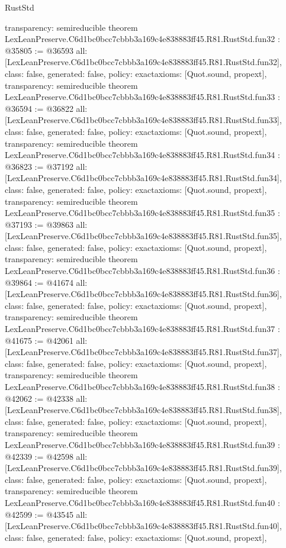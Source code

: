 \begin{lexlean}{RustStd}
\begin{coremodule}
{  transparency: semireducible
}
theorem LexLeanPreserve.C6d1bc0bcc7cbbb3a169c4e838883ff45.R81.RustStd.fun32 : @35805 := @36593 {
  all: [LexLeanPreserve.C6d1bc0bcc7cbbb3a169c4e838883ff45.R81.RustStd.fun32],
  class: false,
  generated: false,
  policy: exact{axioms: [Quot.sound, propext]},
  transparency: semireducible
}
theorem LexLeanPreserve.C6d1bc0bcc7cbbb3a169c4e838883ff45.R81.RustStd.fun33 : @36594 := @36822 {
  all: [LexLeanPreserve.C6d1bc0bcc7cbbb3a169c4e838883ff45.R81.RustStd.fun33],
  class: false,
  generated: false,
  policy: exact{axioms: [Quot.sound, propext]},
  transparency: semireducible
}
theorem LexLeanPreserve.C6d1bc0bcc7cbbb3a169c4e838883ff45.R81.RustStd.fun34 : @36823 := @37192 {
  all: [LexLeanPreserve.C6d1bc0bcc7cbbb3a169c4e838883ff45.R81.RustStd.fun34],
  class: false,
  generated: false,
  policy: exact{axioms: [Quot.sound, propext]},
  transparency: semireducible
}
theorem LexLeanPreserve.C6d1bc0bcc7cbbb3a169c4e838883ff45.R81.RustStd.fun35 : @37193 := @39863 {
  all: [LexLeanPreserve.C6d1bc0bcc7cbbb3a169c4e838883ff45.R81.RustStd.fun35],
  class: false,
  generated: false,
  policy: exact{axioms: [Quot.sound, propext]},
  transparency: semireducible
}
theorem LexLeanPreserve.C6d1bc0bcc7cbbb3a169c4e838883ff45.R81.RustStd.fun36 : @39864 := @41674 {
  all: [LexLeanPreserve.C6d1bc0bcc7cbbb3a169c4e838883ff45.R81.RustStd.fun36],
  class: false,
  generated: false,
  policy: exact{axioms: [Quot.sound, propext]},
  transparency: semireducible
}
theorem LexLeanPreserve.C6d1bc0bcc7cbbb3a169c4e838883ff45.R81.RustStd.fun37 : @41675 := @42061 {
  all: [LexLeanPreserve.C6d1bc0bcc7cbbb3a169c4e838883ff45.R81.RustStd.fun37],
  class: false,
  generated: false,
  policy: exact{axioms: [Quot.sound, propext]},
  transparency: semireducible
}
theorem LexLeanPreserve.C6d1bc0bcc7cbbb3a169c4e838883ff45.R81.RustStd.fun38 : @42062 := @42338 {
  all: [LexLeanPreserve.C6d1bc0bcc7cbbb3a169c4e838883ff45.R81.RustStd.fun38],
  class: false,
  generated: false,
  policy: exact{axioms: [Quot.sound, propext]},
  transparency: semireducible
}
theorem LexLeanPreserve.C6d1bc0bcc7cbbb3a169c4e838883ff45.R81.RustStd.fun39 : @42339 := @42598 {
  all: [LexLeanPreserve.C6d1bc0bcc7cbbb3a169c4e838883ff45.R81.RustStd.fun39],
  class: false,
  generated: false,
  policy: exact{axioms: [Quot.sound, propext]},
  transparency: semireducible
}
theorem LexLeanPreserve.C6d1bc0bcc7cbbb3a169c4e838883ff45.R81.RustStd.fun40 : @42599 := @43545 {
  all: [LexLeanPreserve.C6d1bc0bcc7cbbb3a169c4e838883ff45.R81.RustStd.fun40],
  class: false,
  generated: false,
  policy: exact{axioms: [Quot.sound, propext]},
}
\end{coremodule}
\end{lexlean}
